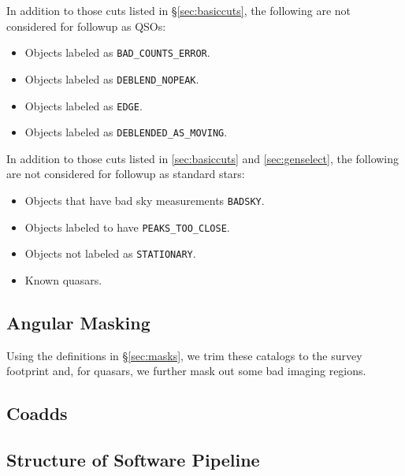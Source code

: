 \documentclass[12pt,preprint]{aastex}
\begin{document}
In addition to those cuts listed in \S \ref{sec:basiccuts}, the following are
not considered for followup as QSOs:

\begin{itemize}

    \item Objects labeled as \texttt{BAD\_COUNTS\_ERROR}.
    \item Objects labeled as \texttt{DEBLEND\_NOPEAK}.
    \item Objects labeled as \texttt{EDGE}.
    \item Objects labeled as \texttt{DEBLENDED\_AS\_MOVING}.

\end{itemize}


 \label{sec:cutstd}

In addition to those cuts listed in \ref{sec:basiccuts} and
\ref{sec:genselect}, the following are not considered for followup as standard
stars:

\begin{itemize}

    \item Objects that have bad sky measurements \texttt{BADSKY}.
    \item Objects labeled to have \texttt{PEAKS\_TOO\_CLOSE}.
    \item Objects not labeled as \texttt{STATIONARY}.
    \item Known quasars.
   
\end{itemize}



\subsection{Angular Masking}

Using the definitions in \S \ref{sec:masks}, we trim these catalogs to the
survey footprint and, for quasars, we further mask out some bad imaging
regions.

\subsection{Coadds}

\subsection{Structure of Software Pipeline} \label{sec:structure}
\end{document}
